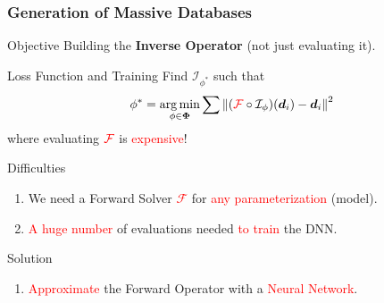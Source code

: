 \begin{frame}
    \frametitle{Generation of Massive Databases}    
\vspace{-2mm}

\begin{block}{Objective}
	\centering
	Building the \textbf{Inverse Operator} (not just evaluating it).
\end{block}

\begin{block}{Loss Function and Training}
Find $\mathcal{I}_{\phi^*}$ such that
\[
\phi^* = \operatorname*{arg\,min}_{\phi \in \boldsymbol{\Phi}} \sum \left\| (\textcolor{red}{\mathcal{F}} \circ \mathcal{I}_{\phi})(\boldsymbol{d}_i) - \boldsymbol{d}_i \right\|^2
\]
where evaluating $\textcolor{red}{\mathcal{F}}$ is \textcolor{red}{expensive}!
\end{block}
    
\begin{block}{Difficulties}
    \begin{enumerate}
        \item We need a Forward Solver \textcolor{red}{$\mathcal{F}$} for \textcolor{red}{any parameterization} (model).
        \item \textcolor{red}{A huge number} of evaluations needed \textcolor{red}{to train} the DNN.
    \end{enumerate}
\end{block}

\begin{block}{Solution}
    \begin{enumerate}
        \item  \textcolor{red}{Approximate} the Forward Operator with a  \textcolor{red}{Neural Network}.
    \end{enumerate}
\end{block}

\end{frame}
